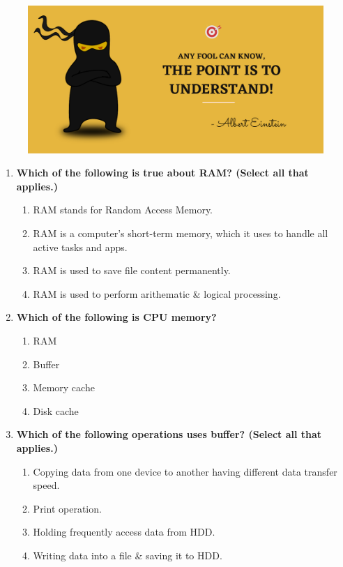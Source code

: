 \setlength{\columnsep}{3pt}
\begin{flushleft}
	
	\paragraph{}
	\bigskip
	
	\begin{figure}[h!]
		\centering
		\includegraphics[scale=.2]{content/practise.jpg}
	\end{figure}	
	\begin{enumerate}
		
		\item \textbf{Which of the following is true about RAM? (Select all that applies.)}
		\begin{enumerate}[label=(\alph*)]
			\item RAM stands for Random Access Memory.  %
			\item RAM is a computer's short-term memory, which it uses to handle all active tasks and apps. %
			\item RAM is used to save file content permanently.
			\item RAM is used to perform arithematic \& logical processing.
		\end{enumerate}
		\bigskip
		\bigskip
		
		\item \textbf{Which of the following is CPU memory?}
		\begin{enumerate}[label=(\alph*)]
			\item RAM  
			\item Buffer 
			\item Memory cache %
			\item Disk cache
		\end{enumerate}
		\bigskip
		\bigskip	
		
		\item \textbf{Which of the following operations uses buffer? (Select all that applies.)}
		\begin{enumerate}[label=(\alph*)]
			\item Copying data from one device to another having different data transfer speed. %
			\item Print operation. %
			\item Holding frequently access data from HDD.
			\item Writing data into a file \& saving it to HDD. %
		\end{enumerate}
		\bigskip
		\bigskip	



\end{enumerate}
\end{flushleft}

